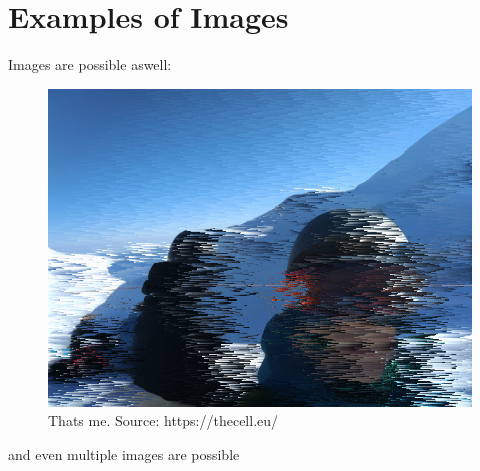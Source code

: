 \documentclass[10pt]{article}
\begin{document}
\section{Examples of Images}
Images are possible aswell:
\begin{figure}[H]
	\includegraphics[width=\textwidth, height=\textheight, keepaspectratio]{example1.png}
	\caption{Thats me. Source: {https://thecell.eu/}}
\end{figure}

and even multiple images are possible
\end{document}
